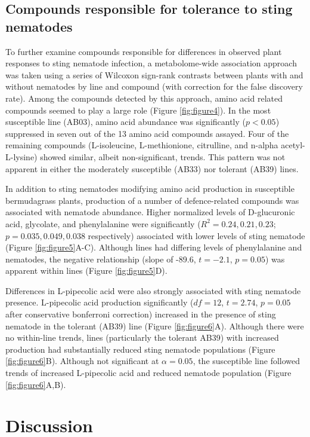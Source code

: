\documentclass[9pt,lineno]{elife}
\begin{document}
\subsection{Compounds responsible for tolerance to sting nematodes}
To further examine compounds responsible for differences in observed plant responses to sting nematode infection, a metabolome-wide association approach was taken using a series of Wilcoxon sign-rank contrasts between plants with and without nematodes by line and compound (with correction for the false discovery rate).  Among the compounds detected by this approach, amino acid related compounds seemed to play a large role (Figure \ref{fig:figure4}).  In the most susceptible line (AB03), amino acid abundance was significantly ($p < 0.05$) suppressed in seven out of the 13 amino acid compounds assayed.  Four of the remaining compounds (L-isoleucine, L-methionione, citrulline, and n-alpha acetyl-L-lysine) showed similar, albeit non-significant, trends.  This pattern was not apparent in either the moderately susceptible (AB33) nor tolerant (AB39) lines.  

In addition to sting nematodes modifying amino acid production in susceptible bermudagrass plants, production of a number of defence-related compounds was associated with nematode abundance.  Higher normalized levels of D-glucuronic acid, glycolate, and phenylalanine were significantly ($R^2 = 0.24, 0.21, 0.23$; $p = 0.035, 0.049, 0.038$ respectively) associated with lower levels of sting nematode (Figure \ref{fig:figure5}A-C).  Although lines had differing levels of phenylalanine and nematodes, the negative relationship (slope of -89.6, $t = -2.1$, $p = 0.05$) was apparent within lines (Figure \ref{fig:figure5}D).  

Differences in L-pipecolic acid were also strongly associated with sting nematode presence. L-pipecolic acid production significantly ($df = 12$, $t = 2.74$, $p = 0.05$ after conservative bonferroni correction) increased in the presence of sting nematode in the tolerant (AB39) line (Figure \ref{fig:figure6}A).  Although there were no within-line trends, lines (particularly the tolerant AB39) with increased production had substantially reduced sting nematode populations (Figure \ref{fig:figure6}B). Although not significant at $\alpha = 0.05$, the susceptible line followed trends of increased L-pipecolic acid and reduced nematode population (Figure \ref{fig:figure6}A,B).  

\section{Discussion}
\end{document}

